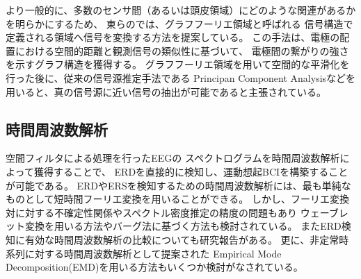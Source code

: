 より一般的に、多数のセンサ間（あるいは頭皮領域）にどのような関連があるかを明らかにするため、
東らの\cite{グラフフーリエ}では、グラフフーリエ領域と呼ばれる
信号構造で定義される領域へ信号を変換する方法を提案している。
この手法は、電極の配置における空間的距離と観測信号の類似性に基づいて、
電極間の繋がりの強さを示すグラフ構造を獲得する。
グラフフーリエ領域を用いて空間的な平滑化を行った後に、従来の信号源推定手法である
Principan Component Analysisなどを用いると、真の信号源に近い信号の抽出が可能であると主張されている。

\subsection{\mc 時間周波数解析}
空間フィルタによる処理を行ったEEGの
スペクトログラムを時間周波数解析によって獲得することで、
ERDを直接的に検知し、運動想起BCIを構築することが可能である\cite{Beta波によるBCI}。
ERDやERSを検知するための時間周波数解析には、最も単純なものとして短時間フーリエ変換を用いることができる。
しかし、フーリエ変換対に対する不確定性関係やスペクトル密度推定の精度の問題もあり
ウェーブレット変換を用いる方法やバーグ法に基づく方法も検討されている。
またERD検知に有効な時間周波数解析の比較についても研究報告がある\cite{時間周波数解析の比較}。
更に、非定常時系列に対する時間周波数解析として提案された
Empirical Mode Decomposition(EMD)を用いる方法もいくつか検討がなされている\cite{EMD,IMF}。

